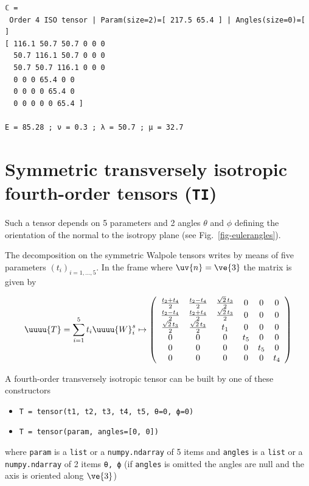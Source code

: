 \documentclass[
  letterpaper,
  DIV=11,
  numbers=noendperiod]{scrreprt}
\providecommand{\tightlist}{%
  \setlength{\itemsep}{0pt}\setlength{\parskip}{0pt}}\usepackage{longtable,booktabs,array}
\begin{document}
\begin{verbatim}
ℂ =
 Order 4 ISO tensor | Param(size=2)=[ 217.5 65.4 ] | Angles(size=0)=[ ]
[ 116.1 50.7 50.7 0 0 0 
  50.7 116.1 50.7 0 0 0 
  50.7 50.7 116.1 0 0 0 
  0 0 0 65.4 0 0 
  0 0 0 0 65.4 0 
  0 0 0 0 0 65.4 ]

E = 85.28 ; ν = 0.3 ; λ = 50.7 ; μ = 32.7
\end{verbatim}

\section{\texorpdfstring{Symmetric transversely isotropic fourth-order
tensors
(\texttt{TI})}{Symmetric transversely isotropic fourth-order tensors (TI)}}\label{symmetric-transversely-isotropic-fourth-order-tensors-ti}

Such a tensor depends on 5 parameters and 2 angles \(\theta\) and
\(\phi\) defining the orientation of the normal to the isotropy plane
(see Fig.~\ref{fig-eulerangles}).

The decomposition on the symmetric Walpole tensors writes by means of
five parameters \((t_i)_{i=1,\ldots,5}\). In the frame where
\(\uv{n}=\ve{3}\) the matrix is given by

\[
\uuuu{T}=\sum_{i=1}^5 t_i \uuuu{W}^s_i
\mapsto
\left(
\begin{array}{cccccc}
\frac{t_2 + t_4}{2} & \frac{t_2 - t_4}{2} & \frac{\sqrt{2} \, t_3}{2} & 0 & 0 & 0 \\
\frac{t_2 - t_4}{2} & \frac{t_2 + t_4}{2} & \frac{\sqrt{2} \, t_3}{2} & 0 & 0 & 0 \\
\frac{\sqrt{2} \, t_3}{2} & \frac{\sqrt{2} \, t_3}{2} & t_1 & 0 & 0 & 0 \\
0 & 0 & 0 & t_5 & 0 & 0 \\
0 & 0 & 0 & 0 & t_5 & 0 \\
0 & 0 & 0 & 0 & 0 & t_4 \\
\end{array}
\right)
\]

A fourth-order transversely isotropic tensor can be built by one of
these constructors

\begin{itemize}
\tightlist
\item
  \texttt{T\ =\ tensor(t1,\ t2,\ t3,\ t4,\ t5,\ θ=0,\ ϕ=0)}
\item
  \texttt{T\ =\ tensor(param,\ angles={[}0,\ 0{]})}
\end{itemize}

where \texttt{param} is a \texttt{list} or a \texttt{numpy.ndarray} of 5
items and \texttt{angles} is a \texttt{list} or a \texttt{numpy.ndarray}
of 2 items \texttt{θ,\ ϕ} (if \texttt{angles} is omitted the angles are
null and the axis is oriented along \(\ve{3}\))
\end{document}
